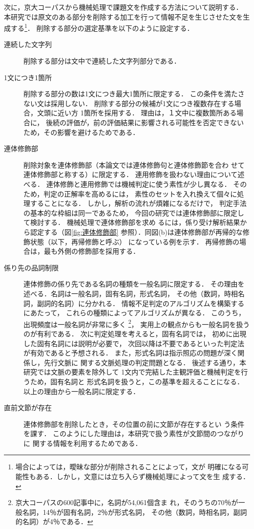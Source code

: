 \documentclass[japanese]{jnlp_1.3e}
\begin{document}
次に，京大コーパスから機械処理で課題文を作成する方法について説明する．
本研究では原文のある部分を削除する加工を行って情報不足を生じさせた文を生
成する\footnote{場合によっては，曖昧な部分が削除されることによって，文が
明確になる可能性もある．しかし，文意には立ち入らず機械処理によって文を生
成する．}． 
削除する部分の選定基準を以下のように設定する．
\begin{description}
 \item [連続した文字列]
	     削除する部分は文中で連続した文字列部分である．
 \item [1文につき1箇所]
	     削除する部分の数は1文につき最大1箇所に限定する．
	     この条件を満たさない文は採用しない．
	     削除する部分の候補が1文につき複数存在する場合，文頭に近い方
	     1箇所を採用する．
	     理由は，１文中に複数箇所ある場合に，
	     後続の評価が，前の評価結果に影響される可能性を否定できない
	     ため，その影響を避けるためである．
 \item [連体修飾部]
	     削除対象を連体修飾部（本論文では連体修飾句と連体修飾節を合わ
	     せて連体修飾部と称する）に限定する．
	     連用修飾を扱わない理由について述べる．
	     連体修飾と連用修飾では機械判定に使う素性が少し異なる．
	     そのため，判定の正解率を高めるには，
	     素性のセットを入れ換えて個々に処理することになる．
	     しかし，解析の流れが煩雑になるだけで，
	     判定手法の基本的な枠組は同一であるため，
	     今回の研究では連体修飾部に限定して検討する．
	     機械処理で連体修飾部を求め
	     るには，係り受け解析結果から認定する（図\ref{fig:連体修飾部}
	     参照）．同図(b)は連体修飾部が再帰的な修飾状態（以下，再帰修飾と呼ぶ）
	     になっている例を示す．
	     再帰修飾の場合は，最も外側の修飾部を採用する．
 \item [係り先の品詞制限]
	     連体修飾の係り先である名詞の種類を一般名詞に限定する．
	     その理由を述べる．名詞は一般名詞，固有名詞，形式名詞，
	     その他（数詞，時相名詞，副詞的名詞）に分かれる．
	     情報不足判定のアルゴリズムを構築するにあたって，
	     これらの種類によってアルゴリズムが異なる．
	     このうち，出現頻度は一般名詞が非常に多く
	     \footnote{京大コーパスの600記事中に，名詞が54,061個含ま
	     れ，そのうちの70{\kern0pt}％が一般名詞，14{\kern0pt}％が固有名詞，2％が形式名詞，
	     その他（数詞，時相名詞，副詞的名詞）が4％である．}，
	     実用上の観点からも一般名詞を扱うのが有利である．
	     次に判定処理を考えると，固有名詞では，
	     初めに出現した固有名詞には説明が必要で，
	     次回以降は不要であるといった判定法が有効であると予想される．
	     また，形式名詞は指示照応の問題が深く関係し，先行文脈に
	     関する文脈処理の判定問題となる．
	     後述する通り，本研究では文脈の要素を除外して
	     1文内で完結した主観評価と機械判定を行うため，固有名詞と
	     形式名詞を扱うと，この基準を超えることになる．
	     以上の理由から一般名詞に限定する．
 \item[直前文節が存在]
	     連体修飾部を削除したとき，その位置の前に文節が存在するとい
	     う条件を課す．
	     このようにした理由は，本研究で扱う素性が文節間のつながりに
	     関する情報を利用するためである．
\end{description}
\end{document}
